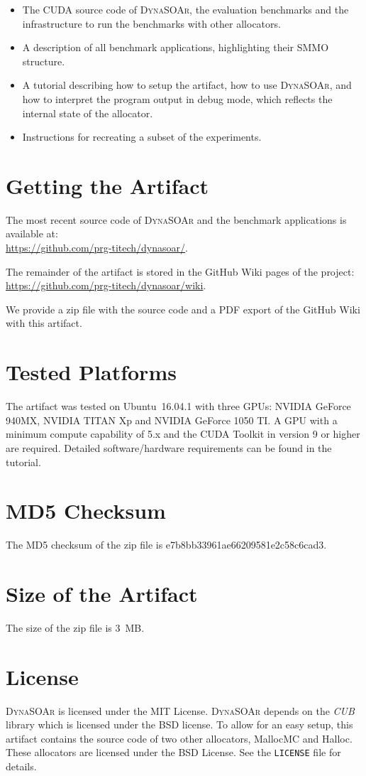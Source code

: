 \documentclass[a4paper,USenglish]{darts-v2019}
\begin{document}
\begin{itemize}
  \item The CUDA source code of \textsc{DynaSOAr}, the evaluation benchmarks and the infrastructure to run the benchmarks with other allocators.
  \item A description of all benchmark applications, highlighting their SMMO structure.
  \item A tutorial describing how to setup the artifact, how to use \textsc{DynaSOAr}, and how to interpret the program output in debug mode, which reflects the internal state of the allocator.
  \item Instructions for recreating a subset of the experiments.
\end{itemize}

\section{Getting the Artifact}
The most recent source code of \textsc{DynaSOAr} and the benchmark applications is available at: \\ \url{https://github.com/prg-titech/dynasoar/}.

\bigskip
\noindent
The remainder of the artifact is stored in the GitHub Wiki pages of the project: \\ \url{https://github.com/prg-titech/dynasoar/wiki}.

\bigskip
\noindent
We provide a zip file with the source code and a PDF export of the GitHub Wiki with this artifact.

\section{Tested Platforms}
The artifact was tested on Ubuntu~16.04.1 with three GPUs: NVIDIA GeForce 940MX, NVIDIA TITAN Xp and NVIDIA GeForce 1050 TI. A GPU with a minimum compute capability of 5.x and the CUDA Toolkit in version 9 or higher are required. Detailed software/hardware requirements can be found in the tutorial.

\section{MD5 Checksum}
The MD5 checksum of the zip file is e7b8bb33961ae66209581e2c58c6cad3.

\section{Size of the Artifact}
The size of the zip file is 3~MB.

\section{License}
\textsc{DynaSOAr} is licensed under the MIT License. \textsc{DynaSOAr} depends on the \emph{CUB} library which is licensed under the BSD license. To allow for an easy setup, this artifact contains the source code of two other allocators, MallocMC and Halloc. These allocators are licensed under the BSD License. See the \texttt{LICENSE} file for details.
\end{document}
